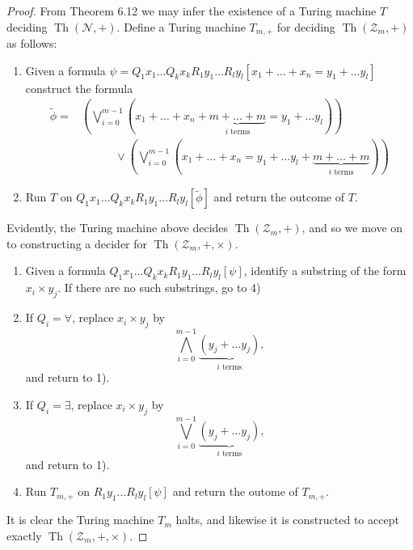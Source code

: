 \documentclass[a4paper,11pt]{article}
\newcommand{\pare}[1]{\left( #1 \right)}
\numberwithin{equation}{section}
\begin{document}
\begin{proof}
    From Theorem 6.12 we may infer the existence of a Turing machine $T$ deciding $\operatorname{Th}(\mathcal{N},+)$. Define a Turing machine $T_{m,+}$ for deciding $\operatorname{Th}(\mathcal{Z}_m,+)$ as follows:
    \begin{enumerate}[label=\arabic*)]
        \item Given a formula $\psi = Q_1x_1\ldots Q_kx_kR_1y_1\ldots R_ly_l[x_1+\ldots+x_n = y_1+\ldots y_l]$ construct the formula
        \begin{align*}
            \widetilde{\phi} = &\pare{\bigvee_{i=0}^{m-1}\pare{x_1+\ldots+x_n + \underbrace{m + \ldots + m}_{i \text{ terms}} = y_1+\ldots y_l}} \\ 
            &\quad\quad\quad \lor 
            \pare{\bigvee_{i=0}^{m-1}\pare{x_1+\ldots+x_n = y_1+\ldots y_l + \underbrace{m + \ldots + m}_{i \text{ terms}}}}
        \end{align*}
        \item Run $T$ on $Q_1x_1\ldots Q_kx_kR_1y_1\ldots R_ly_l[\widetilde{\phi}]$ and return the outcome of $T$.
    \end{enumerate}
    Evidently, the Turing machine above decides $\operatorname{Th}(\mathcal{Z}_m,+)$, and so we move on to constructing a decider for $\operatorname{Th}(\mathcal{Z}_m,+,\times)$. 
    \begin{enumerate}[label=\arabic*)]
        \item Given a formula $Q_1x_1\ldots Q_kx_kR_1y_1\ldots R_ly_l[\psi]$, identify a substring of the form $x_i\times y_j$. If there are no such substrings, go to 4)
        
        \item If $Q_i = \forall$, replace $x_i\times y_j$ by
        $$ \bigwedge_{i=0}^{m-1} \underbrace{\pare{y_j + \ldots y_j}}_{i \text{ terms}}, $$
        and return to 1).
        
        \item If $Q_i = \exists$, replace $x_i\times y_j$ by
        $$ \bigvee_{i=0}^{m-1} \underbrace{\pare{y_j + \ldots y_j}}_{i \text{ terms}}, $$
        and return to 1).
        
        \item Run $T_{m,+}$ on $R_1y_1\ldots R_ly_l[\psi]$ and return the outome of $T_{m,+}$.
    \end{enumerate}
    It is clear the Turing machine $T_m$ halts, and likewise it is constructed to accept exactly $\operatorname{Th}(\mathcal{Z}_m,+,\times)$.
\end{proof}
\end{document}

